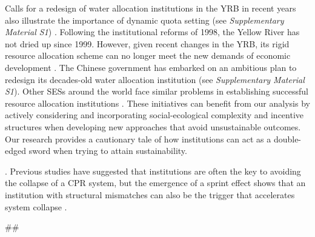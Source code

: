 Calls for a redesign of water allocation institutions in the YRB in recent years also illustrate the importance of dynamic quota setting (see \textit{Supplementary Material S1}) \cite{yuAdaptabilityassessmentpromotion2019}. Following the institutional reforms of 1998, the Yellow River has not dried up since 1999. However, given recent changes in the YRB, its rigid resource allocation scheme can no longer meet the new demands of economic development \cite{wangThingsCurrentSignificance2019}. The Chinese government has embarked on an ambitious plan to redesign its decades-old water allocation institution (see \textit{Supplementary Material S1}). Other SESs around the world face similar problems in establishing successful resource allocation institutions \cite{cummingQuantifyingSocialEcologicalScale2020, muneepeerakulStrategicbehaviorsgovernance2017, cummingAdvancingunderstandingnatural2020, leslieOperationalizingsocialecologicalsystems2015}. These initiatives can benefit from our analysis by actively considering and incorporating social-ecological complexity and incentive structures when developing new approaches that avoid unsustainable outcomes. Our research provides a cautionary tale of how institutions can act as a double-edged sword when trying to attain sustainability.


\cite{ostromRevisitingCommonsLocal1999,ostromGeneralFrameworkAnalyzing2009,castilla-rhoSocialtippingpoints2017}.
Previous studies have suggested that institutions are often the key to avoiding the collapse of a CPR system, but the emergence of a sprint effect shows that an institution with structural mismatches can also be the trigger that accelerates system collapse \cite{bodinConservationSuccessFunction2014,bodinCollaborativeenvironmentalgovernance2017,wangAlignmentsocialecological2019}.


##


